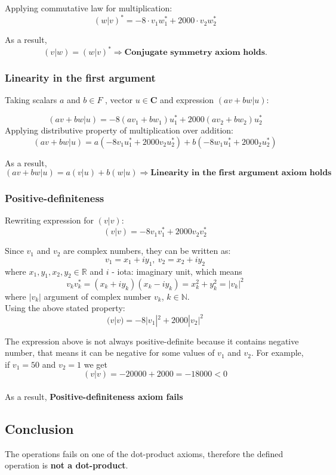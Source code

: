 \documentclass[12pt,a4paper]{article}
\begin{document}
    Applying commutative law for multiplication:
    $$(w|v)^*=-8\cdot v_1w_1^*+2000\cdot v_2w_2^*$$
    
  As a result,  $$(v|w) = (w|v)^* \Rightarrow \textbf{Conjugate symmetry axiom holds.}$$
    
\subsubsection{Linearity in the first argument}
    
    Taking scalars $a$ and $b\in F$ , vector $u\in \pmb{C}$ and expression $(av+bw|u)$:
    
    $$(av+bw|u) = -8(av_1+bw_1)u_1^*+2000(av_2+bw_2)u_2^*$$
    \newpage
    Applying distributive property of multiplication over addition: 
    $$(av+bw|u) = a(-8v_1u_1^*+2000v_2u_2^*)+b(-8w_1u_1^*+2000_2u_2^*)$$
    
   As a result, $$(av+bw|u) = a(v|u)+b(w|u)\Rightarrow \textbf{Linearity in the first argument axiom holds}$$
    
\subsubsection{Positive-definiteness} 
    
    Rewriting expression for $(v|v)$:
    $$(v|v) = -8v_1v_1^*+2000v_2v_2^*$$
    
    Since $v_1$ and $v_2$ are complex numbers, they can be written as: 
    $$v_1=x_1+iy_1,\ v_2=x_2+iy_2$$
    where $x_1,y_1,x_2,y_2\in \mathbb{R}$ and $i$ - iota: imaginary unit, which means 
    $$v_kv_k^*=(x_k+iy_k)(x_k-iy_k)=x_k^2+y_k^2=|v_k|^2$$
    where $|v_k|$ argument of complex number $v_k$, $k\in \mathbb{N}$.\\
    
    Using the above stated property:
    $$(v|v) = -8|v_1|^2+2000|v_2|^2$$

    The expression above is not always positive-definite because it contains negative number, that means it can be negative for some values of $v_1$ and $v_2$. For example, if $v_1=50$ and $v_2=1$ we get $$(v|v)=-20000+2000=-18000 < 0$$  \\ 
    As a result, \textbf{Positive-definiteness axiom fails}

\subsection{Conclusion}
The operations fails on one of the dot-product axioms, therefore the defined operation is \textbf{not a dot-product}.
\end{document}
